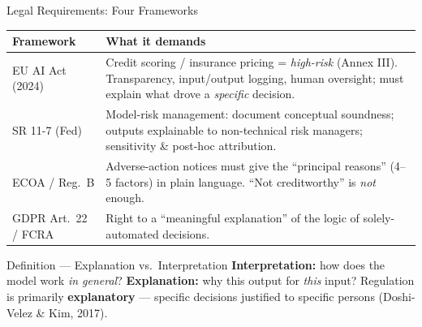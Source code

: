 \documentclass[9pt,t]{beamer}
\begin{document}
\begin{frame}{Legal Requirements: Four Frameworks}
\small
\begin{tabular}{p{2.1cm}p{8.0cm}}
\toprule
\textbf{Framework} & \textbf{What it demands} \\
\midrule
EU AI Act (2024) & Credit scoring / insurance pricing = \emph{high-risk}
  (Annex III). Transparency, input/output logging, human oversight; must
  explain what drove a \emph{specific} decision. \\[2pt]
SR 11-7 (Fed) & Model-risk management: document conceptual soundness; outputs
  explainable to non-technical risk managers; sensitivity \& post-hoc
  attribution. \\[2pt]
ECOA / Reg.\ B & Adverse-action notices must give the ``principal reasons''
  (4--5 factors) in plain language. ``Not creditworthy'' is \emph{not} enough. \\[2pt]
GDPR Art.\ 22 / FCRA & Right to a ``meaningful explanation'' of the logic of
  solely-automated decisions. \\
\bottomrule
\end{tabular}

\medskip
\begin{alertblock}{Definition --- Explanation vs.\ Interpretation}
\textbf{Interpretation:} how does the model work \emph{in general}?
\textbf{Explanation:} why this output for \emph{this} input?
Regulation is primarily \textbf{explanatory} --- specific decisions justified to
specific persons (Doshi-Velez \& Kim, 2017).
\end{alertblock}
\end{frame}
\end{document}
